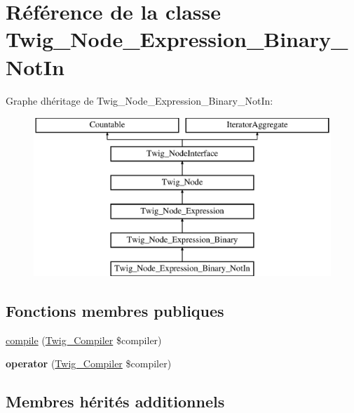 \hypertarget{class_twig___node___expression___binary___not_in}{}\section{Référence de la classe Twig\+\_\+\+Node\+\_\+\+Expression\+\_\+\+Binary\+\_\+\+Not\+In}
\label{class_twig___node___expression___binary___not_in}
Graphe d\textquotesingle{}héritage de Twig\+\_\+\+Node\+\_\+\+Expression\+\_\+\+Binary\+\_\+\+Not\+In\+:\begin{figure}[H]
\begin{center}
\leavevmode
\includegraphics[height=6.000000cm]{class_twig___node___expression___binary___not_in}
\end{center}
\end{figure}
\subsection*{Fonctions membres publiques}
\begin{DoxyCompactItemize}
\item 
\hyperlink{class_twig___node___expression___binary___not_in_a4e0faa87c3fae583620b84d3607085da}{compile} (\hyperlink{class_twig___compiler}{Twig\+\_\+\+Compiler} \$compiler)
\item 
{\bfseries operator} (\hyperlink{class_twig___compiler}{Twig\+\_\+\+Compiler} \$compiler)\hypertarget{class_twig___node___expression___binary___not_in_af77318ec88d5f8a508684970a150b670}{}\label{class_twig___node___expression___binary___not_in_af77318ec88d5f8a508684970a150b670}

\end{DoxyCompactItemize}
\subsection*{Membres hérités additionnels}


